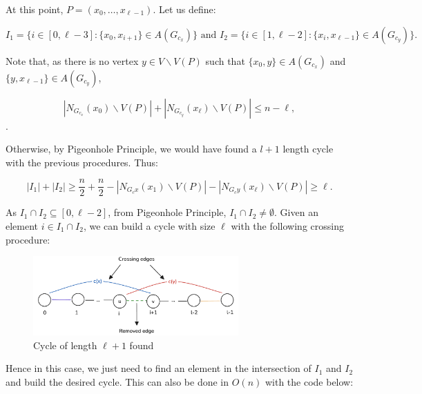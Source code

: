At this point, $P = (x_0, \dots, x_{\ell-1})$. Let us define:

$$
I_1 = \{i \in [0, \ell - 3]: \{x_0, x_{i + 1}\} \in A(G_{c_x})\} \text{ and } I_2 = \{i \in [1, \ell - 2]: \{x_i, x_{\ell-1}\} \in A(G_{c_y})\}.
$$

Note that, as there is no vertex $y \in V \backslash V(P)$ such that $\{x_0, y\} \in A(G_{c_x})$ and $\{y, x_{\ell-1}\} \in A(G_{c_y})$,

$$
|N_{G_{c_x}}(x_0) \backslash V(P)| + |N_{G_{c_y}}(x_\ell) \backslash V(P)| \leq n - \ell,
$$.

Otherwise, by Pigeonhole Principle, we would have found a $l+1$ length cycle with the previous procedures. Thus:

$$
|I_1| + |I_2| \geq \frac{n}{2} + \frac{n}{2} - |N_{G_cx}(x_1) \backslash V(P)| - |N_{G_cy}(x_\ell) \backslash V(P)| \geq \ell.
$$

As $I_1 \cap I_2 \subseteq [0, \ell - 2]$, from Pigeonhole Principle, $I_1 \cap I_2 \neq \emptyset$. Given an element
$i \in I_1 \cap I_2$, we can build a cycle with size $\ell$ with
the following crossing procedure:

\begin{figure}[H]
    \centering
    \includegraphics[width=0.7\textwidth]{figuras/path_cycle_crossing.png}
    \caption{Cycle of length \( \ell + 1 \) found}
    \label{fig:path_cycle_crossing}
\end{figure}

Hence in this case, we just need to find an element in the intersection
of $I_1$ and $I_2$ and build the desired cycle. This can also
be done in $O(n)$ with the code below:

